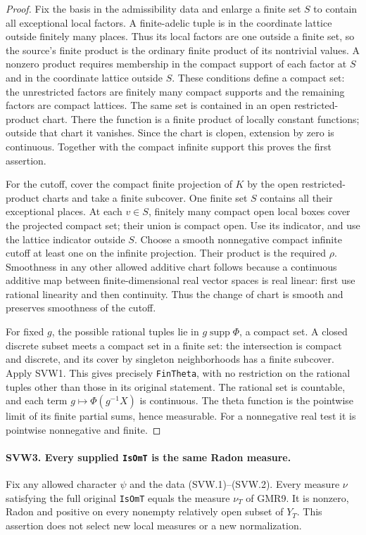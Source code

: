 \documentclass[11pt,a4paper]{article}
\numberwithin{equation}{section}
\theoremstyle{remark}\newtheorem{remark}[theorem]{Remark}
\begin{document}
\begin{proof}
Fix the basis in the admissibility data and enlarge a finite set
$S$ to contain all exceptional local factors.  A finite-adelic tuple
is in the coordinate lattice outside finitely many places.  Thus its
local factors are one outside a finite set, so the source's finite
product is the ordinary finite product of its nontrivial values.
A nonzero product requires membership in the compact support of
each factor at $S$ and in the coordinate lattice outside $S$.
These conditions define a compact set: the unrestricted factors
are finitely many compact supports and the remaining factors are
compact lattices.  The same set is contained in an open
restricted-product chart.  There the function is a finite product
of locally constant functions; outside that chart it vanishes.
Since the chart is clopen, extension by zero is continuous.
Together with the compact infinite support this proves the first
assertion.

For the cutoff, cover the compact finite projection of $K$ by the
open restricted-product charts and take a finite subcover.  One
finite set $S$ contains all their exceptional places.  At each
$v\in S$, finitely many compact open local boxes cover the projected
compact set; their union is compact open.  Use its indicator, and
use the lattice indicator outside $S$.  Choose a smooth nonnegative
compact infinite cutoff at least one on the infinite projection.
Their product is the required $\rho$.  Smoothness in any other
allowed additive chart follows because a continuous additive map
between finite-dimensional real vector spaces is real linear:
first use rational linearity and then continuity.  Thus the change
of chart is smooth and preserves smoothness of the cutoff.

For fixed $g$, the possible rational tuples lie in
$g\operatorname{supp}\Phi$, a compact set.  A closed discrete subset
meets a compact set in a finite set: the intersection is compact
and discrete, and its cover by singleton neighborhoods has a finite
subcover.  Apply SVW1.  This gives precisely \texttt{Fin\allowbreak Theta}, with
no restriction on the rational tuples other than those in its
original statement.  The rational set is countable, and each term
$g\mapsto\Phi(g^{-1}X)$ is continuous.  The theta function is the
pointwise limit of its finite partial sums, hence measurable.
For a nonnegative real test it is pointwise nonnegative and finite.
\end{proof}

\paragraph{SVW3. Every supplied \texttt{Is\allowbreak Om\allowbreak T} is the same Radon measure.}
\label{claim:SVW3}
Fix any allowed character $\psi$ and the data (SVW.1)--(SVW.2).
Every measure $\nu$ satisfying the full original \texttt{Is\allowbreak Om\allowbreak T}
equals the measure $\nu_T$ of GMR9.  It is nonzero, Radon and positive
on every nonempty relatively open subset of $Y_T$.  This assertion
does not select new local measures or a new normalization.
\end{document}
